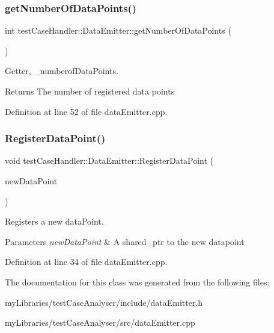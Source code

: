 \subsubsection{\texorpdfstring{getNumberOfDataPoints()}{getNumberOfDataPoints()}}
{\footnotesize\ttfamily int test\+Case\+Handler\+::\+Data\+Emitter\+::get\+Number\+Of\+Data\+Points (\begin{DoxyParamCaption}{ }\end{DoxyParamCaption})}



Getter, \+\_\+numberof\+Data\+Points. 

\begin{DoxyReturn}{Returns}
The number of registered data points 
\end{DoxyReturn}


Definition at line 52 of file data\+Emitter.\+cpp.

\mbox{\label{classtestCaseHandler_1_1DataEmitter_aaedea07c78568b7f97716b731dc48c01}} 
\subsubsection{\texorpdfstring{RegisterDataPoint()}{RegisterDataPoint()}}
{\footnotesize\ttfamily void test\+Case\+Handler\+::\+Data\+Emitter\+::\+Register\+Data\+Point (\begin{DoxyParamCaption}\item[{std\+::shared\+\_\+ptr$<$ \mbox{\hyperlink{classtestCaseHandler_1_1DataPoint}{Data\+Point}} $>$}]{new\+Data\+Point }\end{DoxyParamCaption})}



Registers a new data\+Point. 


\begin{DoxyParams}{Parameters}
{\em new\+Data\+Point} & A shared\+\_\+ptr to the new datapoint \\
\hline
\end{DoxyParams}


Definition at line 34 of file data\+Emitter.\+cpp.



The documentation for this class was generated from the following files\+:\begin{DoxyCompactItemize}
\item 
my\+Libraries/test\+Case\+Analyser/include/data\+Emitter.\+h\item 
my\+Libraries/test\+Case\+Analyser/src/data\+Emitter.\+cpp\end{DoxyCompactItemize}
